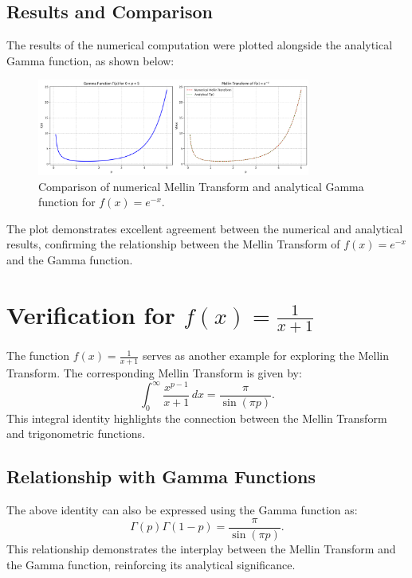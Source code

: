 \documentclass[a4paper, 12pt]{article}
\begin{document}
\subsection{Results and Comparison}
The results of the numerical computation were plotted alongside the analytical Gamma function, as shown below:

\begin{figure}[H]
    \centering
    \includegraphics[width=0.8\textwidth]{Prooving Gamma function.png}
    \caption{Comparison of numerical Mellin Transform and analytical Gamma function for $f(x) = e^{-x}$.}
    \label{fig:gamma_vs_mellin}
\end{figure}

The plot demonstrates excellent agreement between the numerical and analytical results, confirming the relationship between the Mellin Transform of $f(x) = e^{-x}$ and the Gamma function.


\section{Verification for $f(x) = \frac{1}{x+1}$}

The function $f(x) = \frac{1}{x+1}$ serves as another example for exploring the Mellin Transform. The corresponding Mellin Transform is given by:
\begin{equation}
\int_{0}^{\infty} \frac{x^{p-1}}{x+1} \, dx = \frac{\pi}{\sin(\pi p)}.
\end{equation}
This integral identity highlights the connection between the Mellin Transform and trigonometric functions.

\subsection{Relationship with Gamma Functions}
The above identity can also be expressed using the Gamma function as:
\begin{equation}
\Gamma(p) \Gamma(1-p) = \frac{\pi}{\sin(\pi p)}.
\end{equation}
This relationship demonstrates the interplay between the Mellin Transform and the Gamma function, reinforcing its analytical significance.
\end{document}
